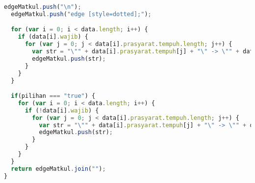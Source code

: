 \begin{lstlisting}[language=Javascript, caption=indexs.js]
  edgeMatkul.push("\n");
  edgeMatkul.push("edge [style=dotted];");

  for (var i = 0; i < data.length; i++) {
    if (data[i].wajib) {
      for (var j = 0; j < data[i].prasyarat.tempuh.length; j++) {
        var str = "\"" + data[i].prasyarat.tempuh[j] + "\" -> \"" + data[i].kode + "\"";
        edgeMatkul.push(str);
      }
    }
  }

  if(pilihan === "true") {
    for (var i = 0; i < data.length; i++) {
      if (!data[i].wajib) {
        for (var j = 0; j < data[i].prasyarat.tempuh.length; j++) {
          var str = "\"" + data[i].prasyarat.tempuh[j] + "\" -> \"" + data[i].kode + "\"";
          edgeMatkul.push(str);
        }
      }
    }
  }
  return edgeMatkul.join("");
}
\end{lstlisting}

 

